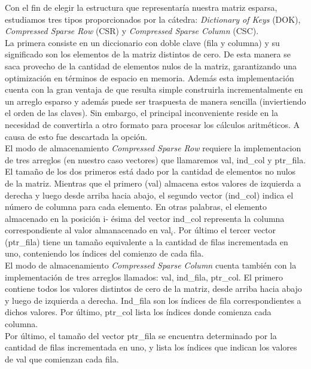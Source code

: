 \documentclass[a4paper]{article}
\begin{document}
 Con el fin de elegir la estructura que representar\'ia nuestra matriz esparsa, estudiamos tres tipos proporcionados por la c\'atedra: \textit{Dictionary of Keys} (DOK), \textit{Compressed Sparse Row} (CSR) y \textit{Compressed Sparse Column} (CSC). \\
\indent La primera consiste en un diccionario con doble clave (fila y columna) y su significado son los elementos de la matriz distintos de cero. De esta manera se saca provecho de la cantidad de elementos nulos de la matriz, garantizando una optimizaci\'on en t\'erminos de espacio en memoria. Adem\'as esta implementaci\'on cuenta con la gran ventaja de que resulta simple construirla incrementalmente en un arreglo esparso y adem\'as puede ser traspuesta de manera sencilla (inviertiendo el orden de las claves). Sin embargo, el principal inconveniente reside en la necesidad de convertirla a otro formato para procesar los c\'alculos aritm\'eticos. A causa de esto fue descartada la opci\'on. \\
\indent El modo de almacenamiento \textit{Compressed Sparse Row} requiere la implementacion de tres arreglos (en nuestro caso vectores) que llamaremos val, ind_col y ptr_fila. El tamaño de los dos primeros est\'a dado por la cantidad de elementos no nulos de la matriz. Mientras que el primero (val) almacena estos valores de izquierda a derecha y luego desde arriba hacia abajo, el segundo vector (ind_col) indica el n\'umero de columna para cada elemento. En otras palabras, el elemento almacenado en la posici\'on i- \'esima del vector ind_col representa la columna correspondiente al valor almanacenado en val$_i$. Por \'ultimo el tercer vector (ptr_fila) tiene un tama\~no equivalente a la cantidad de filas incrementada en uno, conteniendo los \'indices del comienzo de cada fila.\\
\indent El modo de almacenamiento \textit{Compressed Sparse Column} cuenta tambi\'en con la implementaci\'on de tres arreglos llamados: val, ind_fila, ptr_col. El primero contiene todos los valores distintos de cero de la matriz, desde arriba hacia abajo y luego de izquierda a derecha. Ind_fila son los \'indices de fila correspondientes a dichos valores.  Por \'ultimo, ptr_col lista los \'indices donde comienza cada columna.\\
\indent Por \'ultimo, el tama\~no del vector ptr_fila se encuentra determinado por la cantidad de filas incrementada en uno, y lista los \'indices que indican los valores de val que comienzan cada fila.\\
\end{document}
